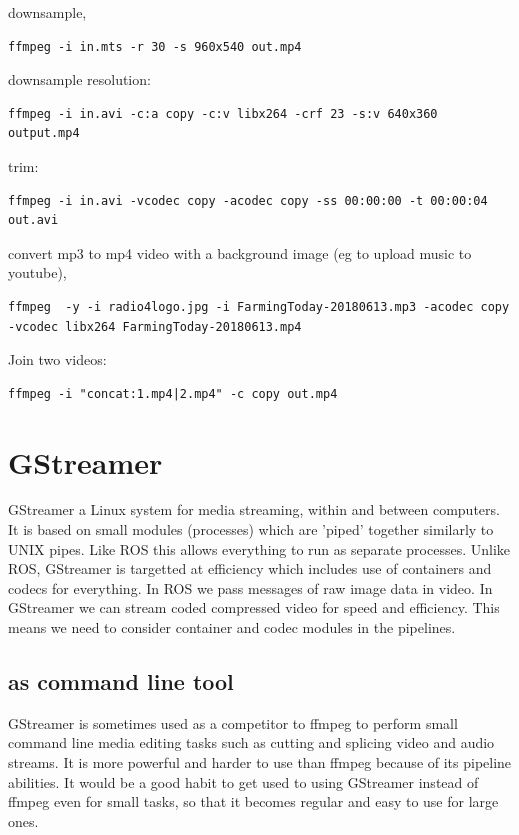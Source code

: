 \documentclass[oneside,english]{scrbook}
\begin{document}
downsample,
\begin{lstlisting}
ffmpeg -i in.mts -r 30 -s 960x540 out.mp4
\end{lstlisting}

downsample resolution: 
\begin{lstlisting}
ffmpeg -i in.avi -c:a copy -c:v libx264 -crf 23 -s:v 640x360 output.mp4
\end{lstlisting}

trim:
\begin{lstlisting}
ffmpeg -i in.avi -vcodec copy -acodec copy -ss 00:00:00 -t 00:00:04 out.avi
\end{lstlisting}

convert mp3 to mp4 video with a background image (eg to upload music to youtube),
\begin{lstlisting}
ffmpeg  -y -i radio4logo.jpg -i FarmingToday-20180613.mp3 -acodec copy -vcodec libx264 FarmingToday-20180613.mp4
\end{lstlisting}

Join two videos:
\begin{lstlisting}
ffmpeg -i "concat:1.mp4|2.mp4" -c copy out.mp4
\end{lstlisting}



\chapter{GStreamer}

GStreamer a Linux system for media streaming, within and between computers. It is based on small modules (processes) which are 'piped' together similarly to UNIX pipes.  Like ROS this allows everything to run as separate processes. Unlike ROS, GStreamer is targetted at efficiency which includes use of containers and codecs for everything. In ROS we pass messages of raw image data in video. In GStreamer we can stream coded compressed video for speed and efficiency.  This means we need to consider container and codec modules in the pipelines.

\section{as command line tool}

GStreamer is sometimes used as a competitor to ffmpeg to perform small command line media editing tasks such as cutting and splicing video and audio streams. It is more powerful and harder to use than ffmpeg because of its pipeline abilities.  It would be a good habit to get used to using GStreamer instead of ffmpeg even for small tasks, so that it becomes regular and easy to use for large ones.
\end{document}
